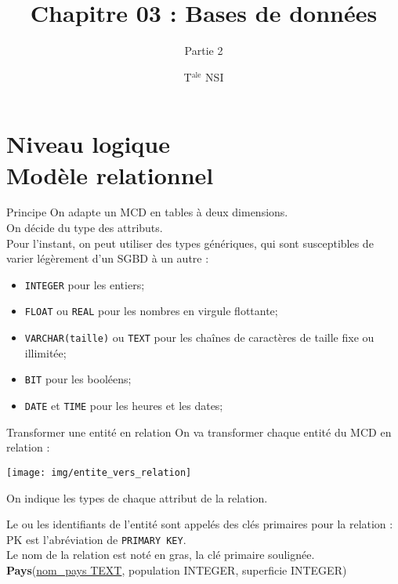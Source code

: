 \documentclass[10pt]{beamer}
\title{Chapitre 03 : Bases de données}
\subtitle{Partie 2}
\author{T$^{\text{ale}}$ NSI}
\begin{document}
	\maketitle
    \section{Niveau logique\\ Modèle relationnel}
\begin{frame}{Principe}
On adapte un MCD en tables à deux dimensions.\\
On décide du type des attributs.\\
Pour l'instant, on peut utiliser des types génériques, qui sont susceptibles de varier légèrement d'un SGBD à un autre :
\begin{itemize}
	\item	\texttt{INTEGER} pour les entiers;
	\item	\texttt{FLOAT} ou \texttt{REAL} pour les nombres en virgule flottante;
    \item	\texttt{VARCHAR(taille)} ou \texttt{TEXT} pour les chaînes de caractères de taille fixe ou illimitée;
    \item 	\texttt{BIT} pour les booléens;
    \item 	\texttt{DATE} et \texttt{TIME} pour les heures et les dates;
\end{itemize}
\end{frame}


\begin{frame}{Transformer une entité en relation}
	On va transformer chaque entité du MCD en \alert{relation} :
	\begin{center}
		\texttt{[image: img/entite\_vers\_relation]}
	\end{center}
	On indique les types de chaque attribut de la relation.

	Le ou les identifiants de l'entité sont appelés des \alert{clés primaires} pour la relation : \og PK\fg{} est l'abréviation de \texttt{PRIMARY KEY}.\\
	Le nom de la relation est noté en gras, la clé primaire soulignée.\\

	\textbf{Pays}(\uline{nom\_pays TEXT}, population INTEGER, superficie INTEGER)\\
\end{frame}
\end{document}
